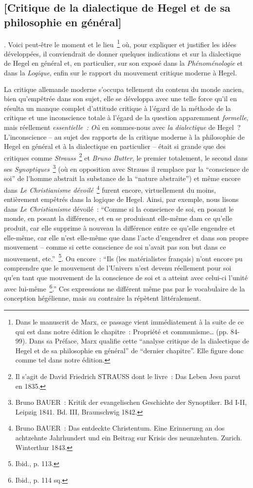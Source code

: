 \documentclass[french,twoside]{book} %
\begin{document}
\subsection[{[Critique de la dialectique de Hegel et de sa philosophie en général]}]{[Critique de la dialectique de Hegel et de sa philosophie en général]}
. Voici peut-être le moment et le lieu \footnote{Dans le manuscrit de Marx, ce passage vient immédiatement à la suite de ce qui est dans notre édition le chapitre : Propriété et communisme… (pp. 84-99). Dans sa Préface, Marx qualifie cette “analyse critique de la dialectique de Hegel et de sa philosophie en général” de “dernier chapitre”. Elle figure donc comme tel dans notre édition.} où, pour expliquer et justifier les idées développées, il conviendrait de donner quelques indications et sur la dialectique de Hegel en général et, en particulier, sur son exposé dans la \emph{Phénoménologie} et dans la \emph{Logique}, enfin sur le rapport du mouvement critique moderne à Hegel.\par
La critique allemande moderne s’occupa tellement du contenu du monde ancien, bien qu’empêtrée dans son sujet, elle se développa avec une telle force qu’il en résulta un manque complet d’attitude critique à l’égard de la méthode de la critique et une inconscience totale à l’égard de la question apparemment \emph{formelle}, mais réellement \emph{essentielle : Où} en sommes-nous avec \emph{la dialectique} de Hegel ? L’inconscience – au sujet des rapports de la critique moderne à la philosophie de Hegel en général et à la dialectique en particulier – était si grande que des critiques comme \emph{Strauss} \footnote{Il s’agit de David Friedrich STRAUSS dont le livre : Das Leben Jesu parut en 1835.} et \emph{Bruno Butter}, le premier totalement, le second dans ses \emph{Synoptiques} \footnote{Bruno BAUER : Kritik der evangelischen Geschichte der Synoptiker. Bd I-II, Leipzig 1841. Bd. III, Braunschwig 1842.} (où en opposition avec Strauss il remplace par la “conscience de soi” de l’homme abstrait la substance de la “nature abstraite”) et même encore dans \emph{Le Christianisme dévoilé} \footnote{Bruno BAUER : Das entdeckte Christentum. Eine Erinnerung an dos achtzehnte Jahrhundert und ein Beitrag sur Krisis des neunzehnten. Zurich. Winterthur 1843.} furent encore, virtuellement du moins, entièrement empêtrés dans la logique de Hegel. Ainsi, par exemple, nous lisons dans \emph{Le Christianisme} dévoilé : “Comme si la conscience de soi, en posant le monde, en posant la différence, et en se produisant elle-même dam ce qu’elle produit, car elle supprime à nouveau la différence entre ce qu’elle engendre et elle-même, car elle n’est elle-même que dans l’acte d’engendrer et dans son propre mouvement – comme si cette conscience de soi n’avait pas son but dans ce mouvement, etc.” \footnote{Ibid., p. 113.}. Ou encore : “Ils (les matérialistes français) n’ont encore pu comprendre que le mouvement de l’Univers n’est devenu réellement pour soi qu’en tant que mouvement de la conscience de soi et a atteint avec celui-ci l’unité avec lui-même \footnote{Ibid., p. 114 sq.}.” Ces expressions ne différent même pas par le vocabulaire de la conception hégélienne, mais au contraire la répètent littéralement.\par
\end{document}
